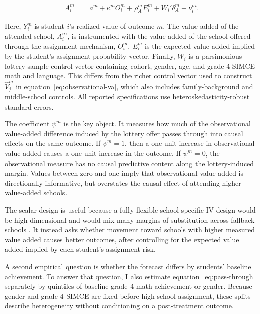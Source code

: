 \documentclass[a4paper, article, english, oneside, unknownkeysallowed, 12pt]{memoir}
\begin{document}
  \begin{equation}
    \begin{aligned}
      A_i^m ={}& a^m + \kappa^m O_i^m + \rho_A^m E_i^m +  W_i'\delta_A^m + \nu_i^m.
    \end{aligned}
    \label{eq:first-stage}
  \end{equation}

Here, $Y_i^m$ is student $i$'s realized value of outcome $m$. The value added of the attended school, $A_i^m$, is instrumented with the value added of the school offered through the assignment mechanism, $O_i^m$.
$E_i^m$ is the expected value added implied by the student's assignment-probability vector.
Finally, $W_i$ is a parsimonious lottery-sample control vector containing cohort, gender, age, and grade-4 SIMCE math and language.
This differs from the richer control vector used to construct $\widehat{V}_j^m$ in equation~\eqref{eq:observational-va}, which also includes family-background and middle-school controls.
All reported specifications use heteroskedasticity-robust standard errors.

The coefficient $\psi^m$ is the key object.
It measures how much of the observational value-added difference induced by the lottery offer passes through into causal effects on the same outcome.
If $\psi^m=1$, then a one-unit increase in observational value added causes a one-unit increase in the outcome.
If $\psi^m=0$, the observational measure has no causal predictive content along the lottery-induced margin.
Values between zero and one imply that observational value added is directionally informative, but overstates the causal effect of attending higher-value-added schools.

The scalar design is useful because a fully flexible school-specific IV design would be high-dimensional and would mix many margins of substitution across fallback schools \parencite{angrist_methods_2023, kirkeboen_field_2016}.
It instead asks whether movement toward schools with higher measured value added causes better outcomes, after controlling for the expected value added implied by each student's assignment risk.

A second empirical question is whether the forecast differs by students' baseline achievement.
To answer that question, I also estimate equation~\eqref{eq:pass-through} separately by quintiles of baseline grade-4 math achievement or gender.
Because gender and grade-4 SIMCE are fixed before high-school assignment, these splits describe heterogeneity without conditioning on a post-treatment outcome.
\end{document}
